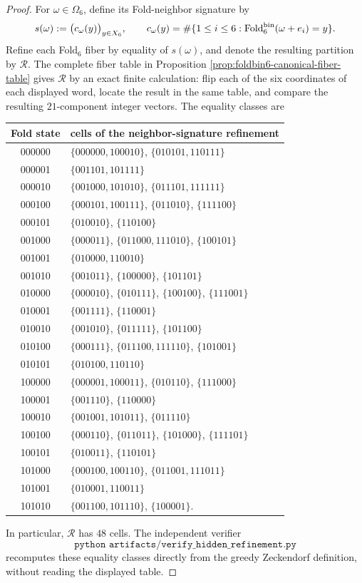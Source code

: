 \begin{proof}
For \(\omega\in\Omega_6\), define its Fold-neighbor signature by
\[
s(\omega):=\bigl(c_\omega(y)\bigr)_{y\in X_6},
\qquad
c_\omega(y)=\#\{1\le i\le6:
\operatorname{Fold}_6^{\mathrm{bin}}(\omega+e_i)=y\}.
\]
Refine each Fold\(_6\) fiber by equality of \(s(\omega)\), and denote the
resulting partition by \(\mathcal R\).  The complete fiber table in Proposition
\ref{prop:foldbin6-canonical-fiber-table} gives \(\mathcal R\) by an exact
finite calculation: flip each of the six coordinates of each displayed word,
locate the result in the same table, and compare the resulting
\(21\)-component integer vectors.  The equality classes are
\begin{center}
\scriptsize
\setlength{\tabcolsep}{3pt}
\renewcommand{\arraystretch}{1.08}
\begin{tabular}{c|l}
Fold state&cells of the neighbor-signature refinement\\ \hline
000000&\(\{000000,100010\}\), \(\{010101,110111\}\)\\
000001&\(\{001101,101111\}\)\\
000010&\(\{001000,101010\}\), \(\{011101,111111\}\)\\
000100&\(\{000101,100111\}\), \(\{011010\}\), \(\{111100\}\)\\
000101&\(\{010010\}\), \(\{110100\}\)\\
001000&\(\{000011\}\), \(\{011000,111010\}\), \(\{100101\}\)\\
001001&\(\{010000,110010\}\)\\
001010&\(\{001011\}\), \(\{100000\}\), \(\{101101\}\)\\
010000&\(\{000010\}\), \(\{010111\}\), \(\{100100\}\), \(\{111001\}\)\\
010001&\(\{001111\}\), \(\{110001\}\)\\
010010&\(\{001010\}\), \(\{011111\}\), \(\{101100\}\)\\
010100&\(\{000111\}\), \(\{011100,111110\}\), \(\{101001\}\)\\
010101&\(\{010100,110110\}\)\\
100000&\(\{000001,100011\}\), \(\{010110\}\), \(\{111000\}\)\\
100001&\(\{001110\}\), \(\{110000\}\)\\
100010&\(\{001001,101011\}\), \(\{011110\}\)\\
100100&\(\{000110\}\), \(\{011011\}\), \(\{101000\}\), \(\{111101\}\)\\
100101&\(\{010011\}\), \(\{110101\}\)\\
101000&\(\{000100,100110\}\), \(\{011001,111011\}\)\\
101001&\(\{010001,110011\}\)\\
101010&\(\{001100,101110\}\), \(\{100001\}\).
\end{tabular}
\end{center}
In particular, \(\mathcal R\) has \(48\) cells.
The independent verifier
\[
\texttt{python artifacts/verify\_hidden\_refinement.py}
\]
recomputes these equality classes directly from the greedy Zeckendorf
definition, without reading the displayed table.


\end{proof}
